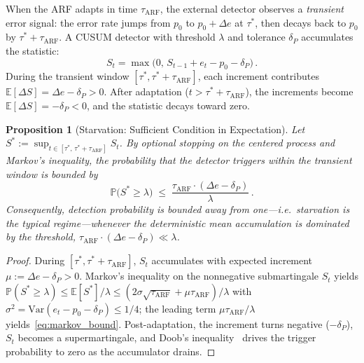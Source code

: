 \documentclass[10pt,conference]{IEEEtran}
\newtheorem{proposition}[theorem]{Proposition}
\theoremstyle{definition}
\begin{document}
When the ARF adapts in time $\tau_{\mathrm{ARF}}$, the external detector observes a \emph{transient} error signal: the error rate jumps from $p_0$ to $p_0 + \Delta e$ at $\tau^*$, then decays back to $p_0$ by $\tau^* + \tau_{\mathrm{ARF}}$.
A CUSUM detector with threshold $\lambda$ and tolerance $\delta_P$ accumulates the statistic:
\begin{equation}\label{eq:cusum}
  S_t = \max\bigl(0,\, S_{t-1} + e_t - p_0 - \delta_P\bigr)\,.
\end{equation}
During the transient window $[\tau^*, \tau^* + \tau_{\mathrm{ARF}}]$, each increment contributes $\mathbb{E}[\Delta S] = \Delta e - \delta_P > 0$.
After adaptation ($t > \tau^* + \tau_{\mathrm{ARF}}$), the increments become $\mathbb{E}[\Delta S] = -\delta_P < 0$, and the statistic decays toward zero.

\begin{proposition}[Starvation: Sufficient Condition in Expectation]\label{prop:starvation}
  Let $S^* := \sup_{t\in[\tau^*,\, \tau^* + \tau_{\mathrm{ARF}}]} S_t$.
  By optional stopping on the centered process and Markov's inequality, the probability that the detector triggers within the transient window is bounded by
  \begin{equation}\label{eq:markov_bound}
    \mathbb{P}\bigl(S^* \ge \lambda\bigr) \;\le\; \frac{\tau_{\mathrm{ARF}} \cdot (\Delta e - \delta_P)}{\lambda}\,.
  \end{equation}
  Consequently, detection probability is bounded away from one---i.e.\ starvation is the typical regime---whenever the deterministic mean accumulation is dominated by the threshold, $\tau_{\mathrm{ARF}} \cdot (\Delta e - \delta_P) \ll \lambda$.
\end{proposition}

\begin{proof}
  During $[\tau^*, \tau^* + \tau_{\mathrm{ARF}}]$, $S_t$ accumulates with expected increment $\mu := \Delta e - \delta_P > 0$. Markov's inequality on the nonnegative submartingale $S_t$ yields $\mathbb{P}(S^* \ge \lambda) \le \mathbb{E}[S^*]/\lambda \le (2\sigma\sqrt{\tau_{\mathrm{ARF}}} + \mu\tau_{\mathrm{ARF}})/\lambda$ with $\sigma^2 = \mathrm{Var}(e_t - p_0 - \delta_P) \le 1/4$; the leading term $\mu\tau_{\mathrm{ARF}}/\lambda$ yields~\eqref{eq:markov_bound}. Post-adaptation, the increment turns negative ($-\delta_P$), $S_t$ becomes a supermartingale, and Doob's inequality~\cite{tartakovsky_2014} drives the trigger probability to zero as the accumulator drains.
\end{proof}
\end{document}
